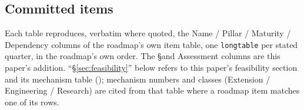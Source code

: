 \subsection{Committed items}\label{sec:E1}

Each table reproduces, verbatim where quoted, the Name / Pillar / Maturity / Dependency columns of
the roadmap's own item table, one \texttt{longtable} per stated quarter, in the roadmap's own
order. The \S and Assessment columns are this paper's addition. ``\S\ref{sec:feasibility}'' below
refers to this paper's feasibility section and its mechanism table ();
mechanism numbers and classes (Extension / Engineering / Research) are cited from that table where
a roadmap item matches one of its rows.

